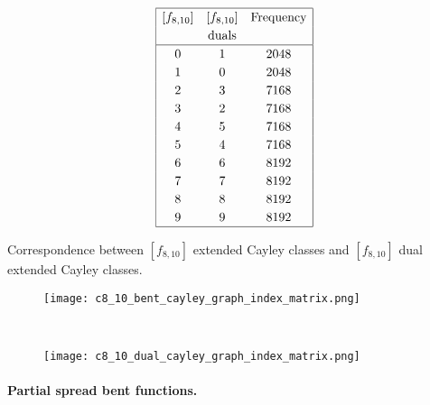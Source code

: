\documentclass[12pt,a4paper]{article}
\begin{document}
\begin{table}
\small{}
\begin{align*}
\def\arraystretch{1.2}
\begin{array}{|ccc|}
\hline
[f_{8,10}] &
[f_{8,10}] &
\text{Frequency}
\\
&
\text{duals} &
\\
\hline
  0 &    1 & 2048
\\
  1 &    0 & 2048
\\
  2 &    3 & 7168
\\
  3 &    2 & 7168
\\
  4 &    5 & 7168
\\
  5 &    4 & 7168
\\
  6 &    6 & 8192
\\
  7 &    7 & 8192
\\
  8 &    8 & 8192
\\
  9 &    9 & 8192
\\
\hline
\end{array}
\end{align*}
\caption{Correspondence between $[f_{8,10}]$ extended Cayley classes and $[f_{8,10}]$ dual extended Cayley classes.}
\label{tab-c8_10-dual-EC_classes}
\end{table}

\begin{figure}[!bhpt] %
\centering
\begin{minipage}{.48\textwidth}
  \centering
  \texttt{[image: c8\_10\_bent\_cayley\_graph\_index\_matrix.png]}
  \label{fig:c8_10_bent_cayley_graph_index_matrix}
\end{minipage}
~~
\begin{minipage}{.48\textwidth}
  \centering
  \texttt{[image: c8\_10\_dual\_cayley\_graph\_index\_matrix.png]}
  \label{fig:c8_10_dual_cayley_graph_index_matrix}
\end{minipage}%
\end{figure}

\paragraph*{Partial spread bent functions.}
\end{document}
